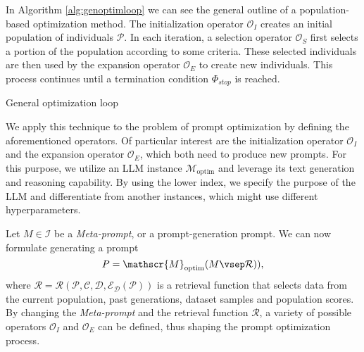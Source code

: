 In Algorithm \ref{alg:genoptimloop} we can see the general outline of a population-based optimization method.
The initialization operator $\mathscr{O}_I$ creates an initial population of individuals $\mathcal{P}$. 
In each iteration, a selection operator $\mathscr{O}_S$ first selects a portion of the population according to some criteria. 
These selected individuals are then used by the expansion operator $\mathscr{O}_E$ to create new individuals.
This process continues until a termination condition $\Phi_{stop}$ is reached.

\begin{algorithm}
    \caption{General optimization loop}
    \label{alg:genoptimloop}
     
         
    \end{algorithm}
    
We apply this technique to the problem of prompt optimization by defining the aforementioned operators.
Of particular interest are the initialization operator $\mathscr{O}_I$ and the expansion operator $\mathscr{O}_E$, which
both need to produce new prompts. For this purpose, we utilize an LLM instance $\mathscr{M}_{\text{optim}}$ and leverage its 
text generation and reasoning capability. By using the lower index, we specify the purpose of the LLM and differentiate 
from another instances, which might use different hyperparameters.

Let $M\in\mathcal{I}$ be a \textit{Meta-prompt}, or a prompt-generation prompt. We can now formulate generating a prompt 
\begin{equation}
    \label{eq:metaprompting}
    P = \mathscr{M}_{\text{optim}}(M\vsep \mathcal{R})),
\end{equation}
where $\mathcal{R} = \mathcal{R}(\mathcal{P}, \mathcal{C}, \mathcal{D}, \mathcal{E}_{\mathcal{D}}(\mathcal{P}))$ is a retrieval function that selects data
from the current population, past generations, dataset samples and population scores. 
By changing the \textit{Meta-prompt} and the retrieval function $\mathcal{R}$, a variety of possible operators $\mathscr{O}_I$ and $\mathscr{O}_E$
can be defined, thus shaping the prompt optimization process.  
